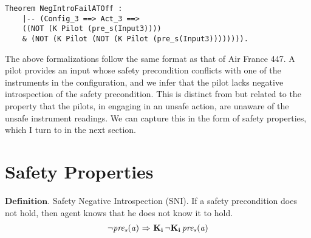 \begin{tcolorbox}\begin{lstlisting}[language=Coq]
Theorem NegIntroFailATOff : 
	|-- (Config_3 ==> Act_3 ==>
	((NOT (K Pilot (pre_s(Input3))))
	& (NOT (K Pilot (NOT (K Pilot (pre_s(Input3)))))))).
	\end{lstlisting}
\end{tcolorbox}
The above formalizations follow the same format as that of Air France 447. A pilot provides an input whose safety precondition conflicts with one of the instruments in the configuration, and we infer that the pilot lacks negative introspection of the safety precondition. This is distinct from but related to the property that the pilots, in engaging in an unsafe action, are unaware of the unsafe instrument readings. We can capture this in the form of safety properties, which I turn to in the next section.

\section{Safety Properties}
$\mathbf{Definition.}$ Safety Negative Introspection (SNI). If a safety precondition does not hold, then agent knows that he does not know it to hold. 
\begin{eqnarray*}
		{\neg} \mathit{pre_s}(\mathit{a}) {\ \Rightarrow \ } \mathbf{K}_{\mathbf{i}}\, {\neg} \mathbf{K}_{\mathbf{i}}\,\mathit{pre_s}(\mathit{a})
\end{eqnarray*}


